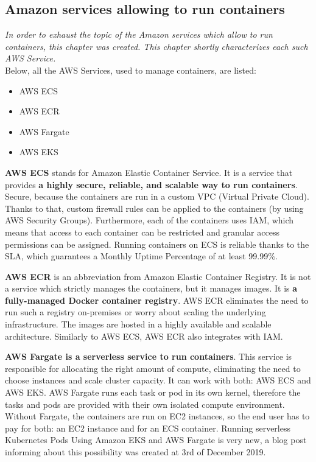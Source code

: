 \subsection{Amazon services allowing to run containers}
\textit{In order to exhaust the topic of the Amazon services which allow to run containers, this chapter was created. This chapter shortly characterizes each such AWS Service.}
\\

Below, all the AWS Services, used to manage containers, are listed:
\begin{itemize}
\item AWS ECS
\item AWS ECR
\item AWS Fargate
\item AWS EKS
\end{itemize}

\textbf{AWS ECS} stands for Amazon Elastic Container Service. It is a service that provides \textbf{a highly secure, reliable, and scalable way to run containers}. Secure, because the containers are run in a custom VPC (Virtual Private Cloud). Thanks to that, custom firewall rules can be applied to the containers (by using AWS Security Groups). Furthermore, each of the containers uses IAM, which means that access to each container can be restricted and granular access permissions can be assigned. Running containers on ECS is reliable thanks to the SLA, which guarantees a Monthly Uptime Percentage of at least 99.99\%\cite{ecs}.

\textbf{AWS ECR} is an abbreviation from Amazon Elastic Container Registry. It is not a service which strictly manages the containers, but it manages images. It is \textbf{a fully-managed Docker container registry}. AWS ECR eliminates the need to run such a registry on-premises or worry about scaling the underlying infrastructure. The images are hosted in a highly available and scalable architecture. Similarly to AWS ECS, AWS ECR also integrates with IAM\cite{ecr}.

\textbf{AWS Fargate is a serverless service to run containers}. This service is responsible for allocating the right amount of compute, eliminating the need to choose instances and scale cluster capacity. It can work with both: AWS ECS and AWS EKS. AWS Fargate runs each task or pod in its own kernel, therefore the tasks and pods are provided with their own isolated compute environment. Without Fargate, the containers are run on EC2 instances, so the end user has to pay for both: an EC2 instance and for an ECS container\cite{fargate}. Running serverless Kubernetes Pods Using Amazon EKS and AWS Fargate is very new, a blog post informing about this possibility was created at 3rd of December 2019\cite{fargate-for-eks}.

